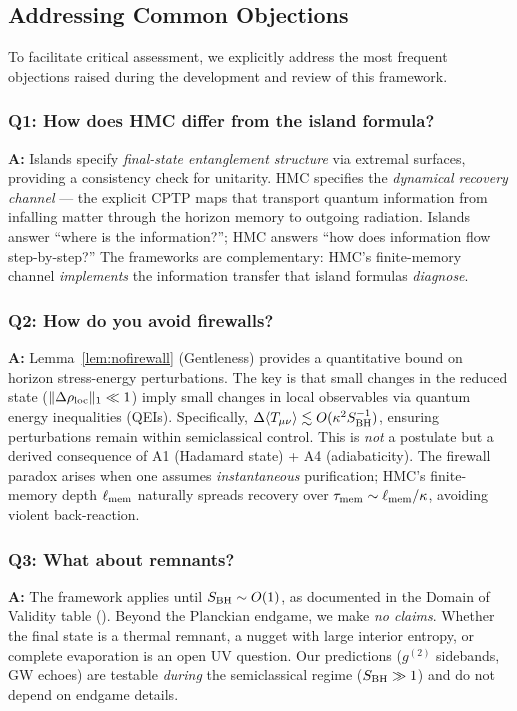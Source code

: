\documentclass[aps,prd,preprint,onecolumn,superscriptaddress,nofootinbib,longbibliography,floatfix,11pt,showpacs,showkeys]{revtex4-2}
\theoremstyle{plain}
\theoremstyle{definition}
\theoremstyle{remark}
\begin{document}
\subsection{Addressing Common Objections}
\label{sec:skeptics_corner}

To facilitate critical assessment, we explicitly address the most frequent objections raised during the development and review of this framework.

\subsubsection{Q1: How does HMC differ from the island formula?}
\textbf{A:} Islands specify \emph{final-state entanglement structure} via extremal surfaces, providing a consistency check for unitarity. HMC specifies the \emph{dynamical recovery channel} --- the explicit CPTP maps that transport quantum information from infalling matter through the horizon memory to outgoing radiation. Islands answer ``where is the information?''; HMC answers ``how does information flow step-by-step?'' The frameworks are complementary: HMC's finite-memory channel \emph{implements} the information transfer that island formulas \emph{diagnose}.

\subsubsection{Q2: How do you avoid firewalls?}
\textbf{A:} Lemma~\ref{lem:nofirewall} (Gentleness) provides a quantitative bound on horizon stress-energy perturbations. The key is that small changes in the reduced state ($\|\Delta\rho_{\rm loc}\|_1 \ll 1$) imply small changes in local observables via quantum energy inequalities (QEIs). Specifically, $\Delta \langle T_{\mu\nu} \rangle \lesssim O(\kappa^2 S_{\rm BH}^{-1})$, ensuring perturbations remain within semiclassical control. This is \emph{not} a postulate but a derived consequence of A1 (Hadamard state) + A4 (adiabaticity). The firewall paradox arises when one assumes \emph{instantaneous} purification; HMC's finite-memory depth $\ell_{\rm mem}$ naturally spreads recovery over $\tau_{\rm mem} \sim \ell_{\rm mem}/\kappa$, avoiding violent back-reaction.

\subsubsection{Q3: What about remnants?}
\textbf{A:} The framework applies until $S_{\rm BH} \sim O(1)$, as documented in the Domain of Validity table (). Beyond the Planckian endgame, we make \emph{no claims}. Whether the final state is a thermal remnant, a nugget with large interior entropy, or complete evaporation is an open UV question. Our predictions ($g^{(2)}$ sidebands, GW echoes) are testable \emph{during} the semiclassical regime ($S_{\rm BH} \gg 1$) and do not depend on endgame details.
\end{document}
